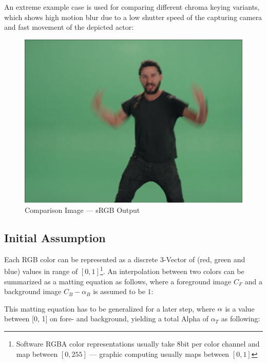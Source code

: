 An extreme example case is used for comparing different chroma keying variants, 
which shows high motion blur due to a low shutter speed of the capturing 
camera and fast movement of the depicted actor:

\begin{figure}[htb]
	\includegraphics[width=\textwidth]{gfx/distances/example.png}
	\caption{Comparison Image \cite{vimeo:shia:2015} --- sRGB Output}
	\label{fig:chroma:color}
\end{figure}

\subsection{Initial Assumption}

Each RGB color can be represented as a discrete 3-Vector of (red, green and 
blue)  values in range of $[0, 1]$\footnote{Software RGBA color representations 
usually take 8bit per color channel and map between $[0, 255]$ --- graphic 
computing usually maps between $[0, 1]$}. An interpolation between two colors 
can be summarized as a matting equation as follows, where a foreground image 
$C_F$ and a background image $C_B - \alpha_B$ is assumed to be $1$:


This matting equation has to be generalized for a later step, where 
$\protect\alpha$ is a value between [0, 1] on fore- and background, yielding a 
total Alpha of $\alpha_T$ as following:



